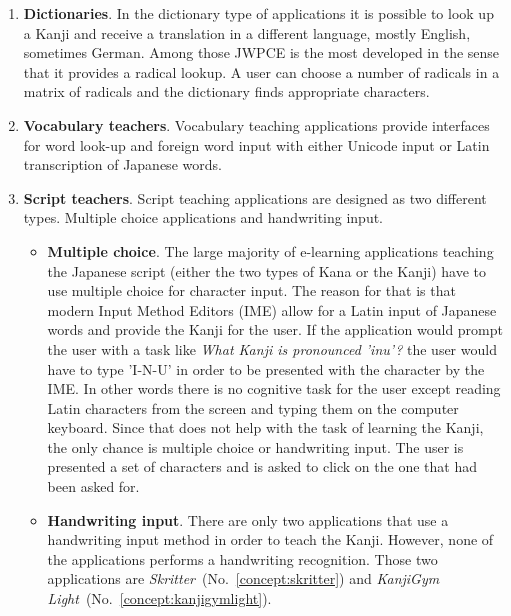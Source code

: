 \begin{enumerate}
  \item \textbf{Dictionaries}. In the dictionary type of applications it is 
        possible to look up a Kanji and receive a translation in a different
        language, mostly English, sometimes German. Among those JWPCE is
        the most developed in the sense that it provides a radical lookup.
        A user can choose a number of radicals in a matrix of radicals
        and the dictionary finds appropriate characters.
  \item \textbf{Vocabulary teachers}. Vocabulary teaching applications provide 
        interfaces for word look-up and foreign word input with either
        Unicode input or Latin transcription of Japanese words.
  \item \textbf{Script teachers}. Script teaching applications are designed 
        as two different types. Multiple choice applications and handwriting 
        input.
        \begin{itemize}
          \item \textbf{Multiple choice}. The large majority of e-learning 
                applications teaching the Japanese script (either the two types
                of Kana or the Kanji) have to use multiple choice for character
                input. The reason for that is that modern 
                Input Method Editors (IME)
                allow for a Latin input of Japanese words and provide the
                Kanji for the user. 
                If the application would prompt the user
                with a task like \emph{What Kanji is pronounced 'inu'?}
                the user would have to type 'I-N-U' in order to be presented
                with the character  by the IME. In other words there is 
                no cognitive task for the user except reading Latin characters 
                from the screen and typing them on the computer keyboard.
                Since that does not help with the task of learning the Kanji,
                the only chance is multiple choice or handwriting input. 
                The user is presented a set 
                of characters and is asked to click on the one that had been 
                asked for.
          \item \textbf{Handwriting input}. There are only two applications
                that use a handwriting input method in order to teach the Kanji.
                However, none of the applications performs a handwriting 
                recognition. Those two applications are 
                \emph{Skritter}~(No.~\ref{concept:skritter}) 
                and 
                \emph{KanjiGym Light}~(No.~\ref{concept:kanjigymlight}).
         \end{itemize}
\end{enumerate}

